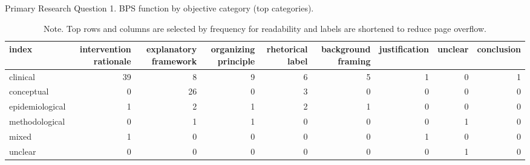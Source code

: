 \begin{table}[htbp]
\raggedright
\caption{Primary Research Question 1. BPS function by objective category (top categories).}
\label{tab.function.by.review.type}
\begin{tabular}{lrrrrrrrr}
\toprule
index & intervention rationale & explanatory framework & organizing principle & rhetorical label & background framing & justification & unclear & conclusion \\
\midrule
clinical & 39 & 8 & 9 & 6 & 5 & 1 & 0 & 1 \\
conceptual & 0 & 26 & 0 & 3 & 0 & 0 & 0 & 0 \\
epidemiological & 1 & 2 & 1 & 2 & 1 & 0 & 0 & 0 \\
methodological & 0 & 1 & 1 & 0 & 0 & 0 & 1 & 0 \\
mixed & 1 & 0 & 0 & 0 & 0 & 1 & 0 & 0 \\
unclear & 0 & 0 & 0 & 0 & 0 & 0 & 1 & 0 \\
\bottomrule
\end{tabular}

\caption*{Note. Top rows and columns are selected by frequency for readability and labels are shortened to reduce page overflow.}
\end{table}
